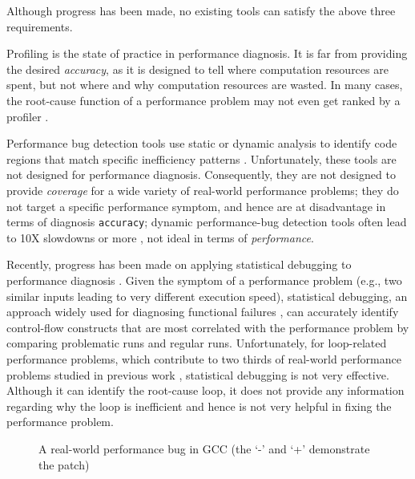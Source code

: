 Although progress has been made, no existing tools can satisfy the above
three requirements.

Profiling is the state of practice in performance diagnosis.
It is far from providing the desired \textit{accuracy}, as it is designed to
tell where computation resources are spent, 
but not where and why computation resources are wasted. 
In many cases, the root-cause function of a performance problem may not even
get ranked by a profiler \citep{SongOOPSLA2014}.

Performance bug detection tools use static or dynamic analysis to identify
code regions that match specific inefficiency patterns 
\citep{Alabama,CARAMEL, Cachetor,XuDataStructure,BloatFSE2008, XuBloatPLDI2009, XuBloatPLDI2010}. 
Unfortunately, these tools are not designed for performance diagnosis.
Consequently, they are not designed to provide \textit{coverage} for a wide
variety of real-world performance problems; they do not target a specific
performance symptom, and hence are at disadvantage in terms of diagnosis
\texttt{accuracy}; dynamic performance-bug detection tools often lead to 
10X slowdowns or more \citep{Cachetor,XuBloatPLDI2010,Alabama}, 
not ideal in terms of \textit{performance}.

Recently, progress has been made on applying statistical debugging to 
performance diagnosis \citep{SongOOPSLA2014}. Given the symptom of 
a performance problem (e.g., two similar inputs leading to very
different execution speed),
statistical debugging, an approach widely used for diagnosing
functional failures \citep{liblit03,liblit05,tarantula1}, can
accurately identify control-flow constructs that are most correlated with
the performance problem by comparing problematic runs and regular runs.
Unfortunately, for loop-related 
performance problems, which contribute to two thirds of
real-world performance problems studied in previous work 
\citep{SongOOPSLA2014,PerfBug}, statistical debugging is not very effective.
Although it can identify the root-cause loop, it does not provide any 
information regarding why the loop is inefficient and hence is not very helpful
in fixing the performance problem.

\begin{figure}
\caption{A real-world performance bug in GCC (the `-' and `+' demonstrate the patch)}
\label{fig:GCC27733}
\end{figure}


